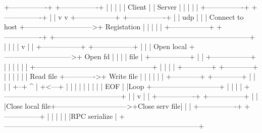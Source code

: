 \documentclass{article}
\begin{document}
                +----------------+                               +----------------+
                |                |                               |                |
                |     Client     |                               |   Server       |
                |                |                               |                |
                +----------------+                               +----------------+
                        |                                                |
                        v                                                v
                +-----------------+                              +----------------+
                |                 |          udp                 |                |
                | Connect to host +----------------------------->+   Registation  |
                |                 |                              |                |
                +-----------------+                              +----------------+
           +-----------------------------------------------------------------------------------+
           |            |                                                                      |
           |            v                                                                      |
           |    +-----------------+                              +-----------------+           |
           |    |   Open local    +----------------------------->+     Open fd     |           |
           |    |      file       |                              +-----------------+           |
           |    +-----------------+                                            |               |
           |                                                                   |               |
           |           +--------------------------------------------------+    |               |
           |           |   +------------+              +------------+     |    |               |
           |           |   | Read file  +------------->+ Write file |     |    |               |
           |           |   +------------+              +------------+     |    |               |
           |        +--+        ^                             |           +<---+               |
           |        |  |        |                             |           |                    |
           |    EOF |  |Loop    +-----------------------------+           |                    |
           |        |  +--------------------------------------------------+                    |
           |        v                                                                          |
           |     +----------------+                               +---------------+            |
           |     |Close local file+------------------------------>+Close serv file|            |
           |     +----------------+                               +---------------+            |
           |                                                                                   |
           |                                                                                   |
           |RPC serialize                                                                      |
           +-----------------------------------------------------------------------------------+
\end{document}
